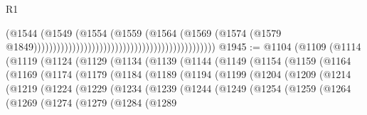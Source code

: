 \begin{lexlean}{R1}
\begin{coremodule}
                                                                                  (@1544
                                                                                    (@1549
                                                                                      (@1554
                                                                                        (@1559
                                                                                          (@1564
                                                                                            (@1569
                                                                                              (@1574
                                                                                                (@1579
                                                                                                  @1849)))))))))))))))))))))))))))))))))))))))))))))))
@1945 := @1104
    (@1109
      (@1114
        (@1119
          (@1124
            (@1129
              (@1134
                (@1139
                  (@1144
                    (@1149
                      (@1154
                        (@1159
                          (@1164
                            (@1169
                              (@1174
                                (@1179
                                  (@1184
                                    (@1189
                                      (@1194
                                        (@1199
                                          (@1204
                                            (@1209
                                              (@1214
                                                (@1219
                                                  (@1224
                                                    (@1229
                                                      (@1234
                                                        (@1239
                                                          (@1244
                                                            (@1249
                                                              (@1254
                                                                (@1259
                                                                  (@1264
                                                                    (@1269
                                                                      (@1274
                                                                        (@1279
                                                                          (@1284
                                                                            (@1289

\end{coremodule}
\end{lexlean}
